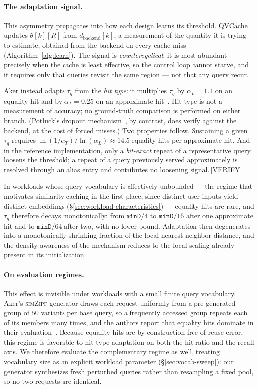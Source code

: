 \paragraph{The adaptation signal.}
This asymmetry propagates into how each design learns its threshold.
QVCache updates $\theta[k][R]$ from $d_{\mathrm{backend}}[k]$, a
measurement of the quantity it is trying to estimate, obtained from the
backend on every cache miss (Algorithm~\ref{alg:learn}). The signal is
\emph{countercyclical}: it is most abundant precisely when the cache is
least effective, so the control loop cannot starve, and it requires only
that queries revisit the same region --- not that any query recur.

Aker instead adapts $\tau_q$ from the \emph{hit type}: it multiplies
$\tau_q$ by $\alpha_L = 1.1$ on an equality hit and by
$\alpha_T = 0.25$ on an approximate hit~\cite{aker}. Hit type is not a
measurement of accuracy; no ground-truth comparison is performed on
either branch. (Potluck's dropout mechanism~\cite{potluck}, by contrast,
does verify against the backend, at the cost of forced misses.) Two
properties follow. Sustaining a given $\tau_q$ requires
$\ln(1/\alpha_T)/\ln(\alpha_L) \approx 14.5$ equality hits per
approximate hit. And in the reference implementation, only a
\emph{bit-exact} repeat of a representative query loosens the
threshold; a repeat of a query previously served approximately is
resolved through an alias entry and contributes no loosening
signal.\,[VERIFY]

In workloads whose query vocabulary is effectively unbounded --- the
regime that motivates similarity caching in the first place, since
distinct user inputs yield distinct embeddings
(\S\ref{sec:workload-characteristics}) --- equality hits are rare, and
$\tau_q$ therefore decays monotonically: from $\texttt{minD}/4$ to
$\texttt{minD}/16$ after one approximate hit and to $\texttt{minD}/64$
after two, with no lower bound. Adaptation then degenerates into a
monotonically shrinking fraction of the local nearest-neighbor
distance, and the density-awareness of the mechanism reduces to the
local scaling already present in its initialization.

\paragraph{On evaluation regimes.}
This effect is invisible under workloads with a small finite query
vocabulary. Aker's \textsc{simZipf} generator draws each request
uniformly from a pre-generated group of $50$ variants per base query, so
a frequently accessed group repeats each of its members many times, and
the authors report that equality hits dominate in their
evaluation~\cite{aker}. Because equality hits are by construction free
of reuse error, this regime is favorable to hit-type adaptation on both
the hit-ratio and the recall axis. We therefore evaluate the
complementary regime as well, treating vocabulary size as an explicit
workload parameter (\S\ref{sec:vocab-sweep}): our generator
synthesizes fresh perturbed queries rather than resampling a fixed pool,
so no two requests are identical.

